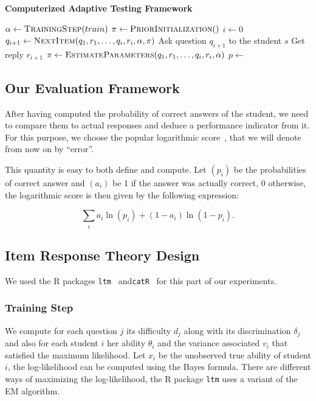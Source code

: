 \documentclass{sig-alternate}
\begin{document}
\begin{algorithm}
\caption*{\textbf{Computerized Adaptive Testing Framework}}
\begin{algorithmic}
\State $\alpha \gets \Call{TrainingStep}{train}$
\State $\pi \gets \Call{PriorInitialization}$
\State $i \gets 0$
		\State $q_{i + 1} \gets \Call{NextItem}{q_1, r_1, \ldots, q_i, r_i, \alpha, \pi}$
		\State Ask question $q_{i + 1}$ to the student $s$
		\State Get reply $r_{i + 1}$
		\State $\pi \gets \Call{EstimateParameters}{q_1, r_1, \ldots, q_i, r_i, \alpha}$
	\EndWhile
	\State $p \gets$ 
	\State {}
\EndFor
\EndProcedure
\end{algorithmic}
\end{algorithm}

\subsection{Our Evaluation Framework}

After having computed the probability of correct answers of the student, we need to compare them to actual responses and deduce a performance indicator from it. For this purpose, we choose the popular logarithmic score~\citep{Gneiting2007}, that we will denote from now on by ``error''.

This quantity is easy to both define and compute. Let $(p_i)$ be the probabilities of correct answer and $(a_i)$ be 1 if the answer was actually correct, 0 otherwise, the logarithmic score is then given by the following expression: 

\[ \sum_i a_i\ln(p_i) + (1-a_i)\ln(1-p_i).\]

\subsection{Item Response Theory Design}

We used the R packages \texttt{ltm}~\citep{Rizopoulos2006} and\linebreak \texttt{catR}~\citep{MagisRaiche2012} for this part of our experiments.

\subsubsection{Training Step}

We compute for each question $j$ its difficulty $d_j$ along with its discrimination $\delta_j$ and also for each student $i$ her ability $\theta_i$ and the variance associated $v_i$ that satisfied the maximum likelihood. Let $x_i$ be the unobserved true ability of student $i$, the log-likelihood can be computed using the Bayes formula. There are different ways of maximizing the log-likelihood, the R package \texttt{ltm} uses a variant of the EM algorithm.
\end{document}
